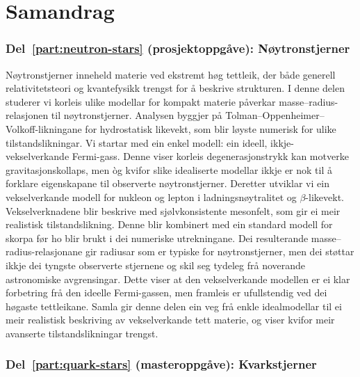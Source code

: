 \chapter*{Samandrag}

\subsection*{Del~\ref{part:neutron-stars} (prosjektoppgåve): Nøytronstjerner}

Nøytronstjerner inneheld materie ved ekstremt høg tettleik, der både generell
relativitetsteori og kvantefysikk trengst for å beskrive strukturen. I denne
delen studerer vi korleis ulike modellar for kompakt materie påverkar
masse--radius-relasjonen til nøytronstjerner. Analysen byggjer på
Tolman--Oppenheimer--Volkoff-likningane for hydrostatisk likevekt, som blir
løyste numerisk for ulike tilstandslikningar.
Vi startar med ein enkel modell: ein ideell, ikkje-vekselverkande Fermi-gass.
Denne viser korleis degenerasjonstrykk kan motverke gravitasjonskollaps, men
òg kvifor slike idealiserte modellar ikkje er nok til å forklare eigenskapane
til observerte nøytronstjerner.
Deretter utviklar vi ein vekselverkande modell for nukleon og lepton i
ladningsnøytralitet og \(\beta\)-likevekt. Vekselverknadene blir beskrive med
sjølvkonsistente mesonfelt, som gir ei meir realistisk tilstandslikning. Denne
blir kombinert med ein standard modell for skorpa før ho blir brukt i dei
numeriske utrekningane.
Dei resulterande masse--radius-relasjonane gir radiusar som er typiske for
nøytronstjerner, men dei støttar ikkje dei tyngste observerte stjernene og
skil seg tydeleg frå noverande astronomiske avgrensingar. Dette viser at den
vekselverkande modellen er ei klar forbetring frå den ideelle Fermi-gassen, men
framleis er ufullstendig ved dei høgaste tettleikane.
Samla gir denne delen ein veg frå enkle idealmodellar til ei meir realistisk
beskriving av vekselverkande tett materie, og viser kvifor meir avanserte
tilstandslikningar trengst.

\subsection*{Del~\ref{part:quark-stars} (masteroppgåve): Kvarkstjerner}

